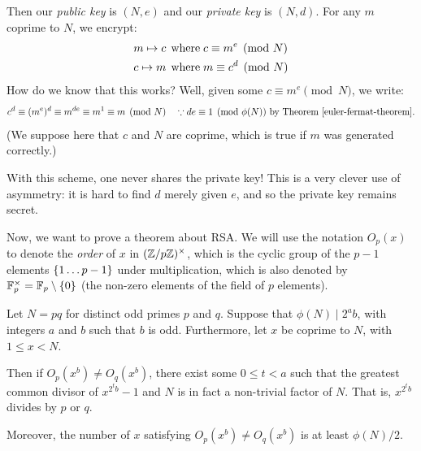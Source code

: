 \documentclass{article}
\begin{document}
Then our \textit{public key} is $(N, e)$ and our \textit{private key} is $(N, d)$. For any $m$ coprime to $N$, we encrypt:
\begin{align*}
    m \mapsto c &\mathrel{\, \text{where}} c \equiv m^e \pmod N \\
    c \mapsto m &\mathrel{\, \text{where}} m \equiv c^d \pmod N
\end{align*}
How do we know that this works? Well, given some $c \equiv m^e \pmod N$, we write:
\[
c^d \equiv (m^e)^d \equiv m^{de} \equiv m^1 \equiv m \pmod N
\quad \because de \equiv 1 \pmod{\phi(N)} \ 
\text{by Theorem \ref{euler-fermat-theorem}}.
\]
(We suppose here that $c$ and $N$ are coprime, which is true if $m$ was generated correctly.)

\begin{note}
	With this scheme, one never shares the private key! This is a very clever use of asymmetry: it is hard to find $d$ merely given $e$, and so the private key remains secret.
\end{note}

Now, we want to prove a theorem about RSA. We will use the notation $O_p(x)$ to denote the \textit{order} of $x$ in $(\mathbb{Z}/p\mathbb{Z})^\times$, which is the cyclic group of the $p-1$ elements $\left\lbrace 1 \dots p-1 \right\rbrace$ under multiplication, which is also denoted by $\mathbb{F}_p^\times = \mathbb{F}_p \setminus \left\lbrace 0 \right\rbrace$ (the non-zero elements of the field of $p$ elements).

\begin{theorem}
	\label{semiprime-order-theorem}
    Let $N = pq$ for distinct odd primes $p$ and $q$. Suppose that $\phi(N) \mid 2^a b$, with integers $a$ and $b$ such that $b$ is odd. Furthermore, let $x$ be coprime to $N$, with $1 \leq x < N$.
    
    Then if $O_p(x^b) \neq O_q(x^b)$, there exist some $0 \leq t < a$ such that the greatest common divisor of $x^{2^tb}-1$ and $N$ is in fact a non-trivial factor of $N$. That is, $x^{2^tb}$ divides by $p$ or $q$.
    
    Moreover, the number of $x$ satisfying $O_p(x^b) \neq O_q(x^b)$ is at least $\phi(N) / 2$.
\end{theorem}
\end{document}
